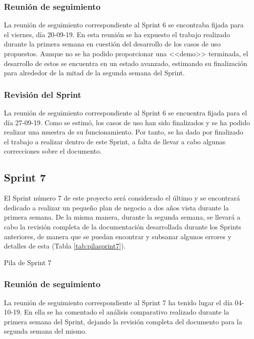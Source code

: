 \subsubsection{Reunión de seguimiento}
La reunión de seguimiento correspondiente al Sprint 6 se encontraba fijada para el viernes, día 20-09-19. En esta reunión se ha expuesto el trabajo realizado durante la primera semana en cuestión del desarrollo de los casos de uso propuestos. Aunque no se ha podido proporcionar una <<demo>> terminada, el desarrollo de estos se encuentra en un estado avanzado, estimando su finalización para alrededor de la mitad de la segunda semana del Sprint.

\subsubsection{Revisión del Sprint}
La reunión de seguimiento correspondiente al Sprint 6 se encuentra fijada para el día 27-09-19. Como se estimó, los casos de uso han sido finalizados y se ha podido realizar una muestra de su funcionamiento. Por tanto, se ha dado por finalizado el trabajo a realizar dentro de este Sprint, a falta de llevar a cabo algunas correcciones sobre el documento.

\clearpage

\subsection{Sprint 7}
El Sprint número 7 de este proyecto será considerado el último y se encontrará dedicado a realizar un pequeño plan de negocio a dos años vista durante la primera semana. De la misma manera, durante la segunda semana, se llevará a cabo la revisión completa de la documentación desarrollada durante los Sprints anteriores, de manera que se puedan encontrar y subsanar algunos errores y detalles de esta (Tabla \ref{tab:pilasprint7}).

\begin{table}[!htbp]
	\centering
	{\small
		
	}
	\caption[Pila de Sprint 7]
	{Pila de Sprint 7}
	\label{tab:pilasprint7}
\end{table}

\subsubsection{Reunión de seguimiento}
La reunión de seguimiento correspondiente al Sprint 7 ha tenido lugar el día 04-10-19. En ella se ha comentado el análisis comparativo realizado durante la primera semana del Sprint, dejando la revisión completa del documento para la segunda semana del mismo.

